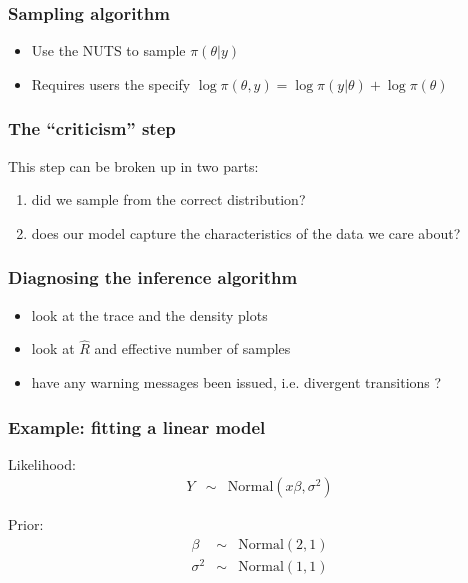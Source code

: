 \documentclass[xcolor=table]{beamer}
\begin{document}
\begin{frame}
  \frametitle{Sampling algorithm}
  
  \begin{itemize}
    \item Use the NUTS to sample $\pi (\theta | y)$
    \item Requires users the specify $\log \pi(\theta, y) = \log \pi(y | \theta) + \log \pi(\theta)$
  \end{itemize}

\end{frame}

\begin{frame}
  \frametitle{The ``criticism'' step}
  
  This step can be broken up in two parts:
  \begin{enumerate}
    \item did we sample from the correct distribution?
    \item does our model capture the characteristics of the data we care about?
  \end{enumerate}

\end{frame}

\begin{frame}
  \frametitle{Diagnosing the inference algorithm}
  \begin{itemize}
    \item look at the trace and the density plots
    \item look at $\hat R$ and effective number of samples
    \item have any warning messages been issued, i.e. divergent transitions ?
  \end{itemize}

\end{frame}

\begin{frame}
  \frametitle{Example: fitting a linear model}

  Likelihood:
  \begin{eqnarray*}
    Y & \sim & \mathrm{Normal}(x \beta, \sigma^2)
  \end{eqnarray*}

  Prior:
  \begin{eqnarray*}
    \beta & \sim & \mathrm{Normal}(2, 1) \\
    \sigma^2 & \sim & \mathrm{Normal}(1, 1)
  \end{eqnarray*}

\end{frame}
\end{document}
